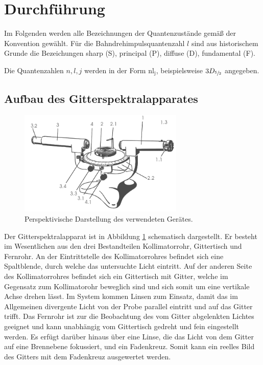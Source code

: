 \section{Durchf\"uhrung}
\label{sec:Durchfuehrung}
Im Folgenden werden alle Bezeichnungen der Quantenzustände gemäß der Konvention gewählt.
Für die Bahndrehimpulsquantenzahl $l$ sind aus historischem Grunde die Bezeichungen 
sharp (S),
principal (P),
diffuse (D),
fundamental (F).

Die Quantenzahlen $n,l,j$ werden in der Form $\mathup{nl}_\mathup{j}$, beispielsweise $3D_{\sfrac{5}{2}}$ angegeben.
\subsection{Aufbau des Gitterspektralapparates}
\begin{figure}
	\centering
	\includegraphics[width=0.7\textwidth]{Bilder/Apparat.png}
	\caption{Perspektivische Darstellung des verwendeten Gerätes. \cite{skript}} 
	\label{fig:Gitterspektralapparat}
\end{figure}
Der Gitterspektralapparat ist in Abbildung \ref{fig:Gitterspektralapparat} schematisch dargestellt.
Er besteht im Wesentlichen aus den drei Bestandteilen Kollimatorrohr, Gittertisch und Fernrohr.
An der Eintrittstelle des Kollimatorrohres befindet sich eine Spaltblende, durch welche das untersuchte Licht eintritt.
Auf der anderen Seite des Kollimatorrohres befindet sich ein Gittertisch mit Gitter, welche im Gegensatz zum Kollimatorohr beweglich sind und sich somit um eine vertikale Achse drehen lässt. 
Im System kommen Linsen zum Einsatz, damit das im Allgemeinen divergente Licht von der Probe parallel eintritt und auf das Gitter trifft.
Das Fernrohr ist zur die Beobachtung des vom Gitter abgelenkten Lichtes geeignet und kann unabhängig vom Gittertisch gedreht und fein eingestellt werden. 
Es erfügt darüber hinaus über eine Linse, die das Licht von dem Gitter auf eine Brennebene fokussiert, und ein Fadenkreuz.
Somit kann ein reelles Bild des Gitters mit dem Fadenkreuz ausgewertet werden.

